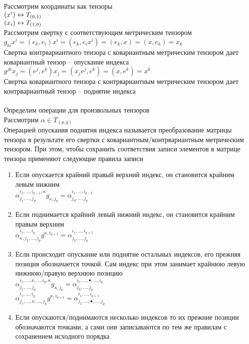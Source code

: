 \documentclass[12pt]{article}
\begin{document}
Рассмотрим координаты как тензоры\\
$(x^i) \leftrightarrow T_{(0,1)}$\\
$(x_i) \leftrightarrow T_{(1,0)}$\\
Рассмотрим свертку с соответствующим метрическим тензором\\
$g_{ki} x^i =(e_k, e_i) x^i = (e_k, e_ix^i) = (e_k, x) = (x, e_k) = x_k$\\
Свертка контрвариантного тензора с ковариантным метрическим тензором дает ковариантный тензор -- опускание индекса\\
$g^{jk} x_j = (e^j, e^k) x_j = (x_j e^j, e^k) = (x, e^k) = x^k$\\
Свертка ковариантного тензора с контрвариантным метрическим тензором дает контрвариантный тензор -- поднятие индекса\\\\
Определим операции для произвольных тензоров\\
Рассмотрим $\alpha\in T_{(p,q)}$\\
Операцией опускания поднятия индекса называется преобразование матрицы тензора в результате его свертки с ковариантным/контрвариантным метрическим тензором. При этом, чтобы сохранить соответствия записи элементов в матрице тензора применяют следующие правила записи
\begin{enumerate}
    \item Если опускается крайний правый верхний индекс, он становится крайним левым нижним\\
    $\alpha^{i_1, \ldots, i_{q-1}, \kappa}_{j_1, \ldots, j_p} g_{\kappa,j_0} = \alpha^{i_1, \ldots, i_{q-1}}_{j_0, \ldots, j_p}$
    \item Если поднимается крайний левый нижний индекс, он становится крайним правым верхним\\
    $\alpha^{i_1, \ldots, i_q}_{\kappa, j_2, \ldots, j_p} g^{\kappa,i_{q+1}} = \alpha^{i_1, \ldots, i_{q+1}}_{j_2, \ldots, j_p}$
    \item Если происходит опускание или поднятие остальных индексов, его прежняя позиция обозначается точкой. Сам индекс при этом занимает крайнюю левую нижнюю/правую верхнюю позицию\\
    $\alpha^{i_1, \ldots, \kappa, \ldots, i_q, \kappa}_{j_1, \ldots, j_p} g_{\kappa,j_0} = \alpha^{i_1, \ldots, \bullet, \ldots, i_q}_{j_0, \ldots, j_p}$\\
    $\alpha^{i_1, \ldots, i_q}_{j_1, \ldots, \kappa, \ldots, j_p} g^{\kappa,i_{q+1}} = \alpha^{i_1, \ldots, i_{q+1}}_{j_1, \ldots, \bullet, \ldots, j_p}$
    \item Если опускаются/поднимаются несколько индексов то их прежние позиции обозначаются точками, а сами они записываются по тем же правилам с сохранением исходного порядка
\end{enumerate}
\end{document}
